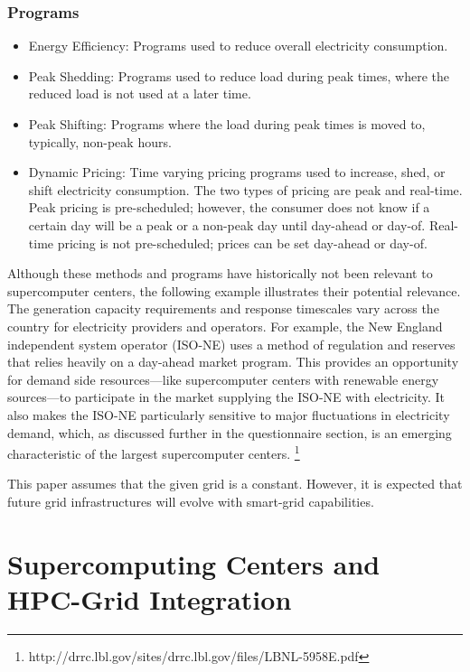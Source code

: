 \subsubsection{Programs}
\begin{itemize}
\item Energy Efficiency:  Programs used to reduce overall electricity consumption.

\item Peak Shedding:  Programs used to reduce load during peak times, 
where the reduced load is not used at a later time. 

\item Peak Shifting:  Programs where the load during peak times is moved to, typically, non-peak hours. 

\item Dynamic Pricing:  Time varying pricing programs used to increase, shed,
 or shift electricity consumption. 
The two types of pricing are peak and real-time.  Peak pricing is pre-scheduled; however, the consumer 
does not know if a certain day will be a peak or a non-peak day until day-ahead or day-of.  
Real-time pricing is not pre-scheduled; prices can be set day-ahead or day-of.
\end{itemize}

Although these methods and programs have historically not been relevant to supercomputer centers,
the following example illustrates their potential relevance.
The generation capacity requirements and response timescales vary across the country for electricity 
providers and operators. For example, the New England independent system operator (ISO-NE) uses a method 
of regulation and reserves that relies heavily on a day-ahead market program. This provides an opportunity 
for demand side resources---like supercomputer centers with renewable energy sources---to participate in the 
market supplying the ISO-NE with electricity.  It also makes the ISO-NE particularly sensitive to major 
fluctuations in electricity demand, which, as discussed further in the questionnaire section, is an emerging 
characteristic of the largest supercomputer centers.  
\footnote {http://drrc.lbl.gov/sites/drrc.lbl.gov/files/LBNL-5958E.pdf}

This paper assumes that the given grid is a constant. However, it is expected 
that future grid infrastructures will 
evolve with smart-grid capabilities. 

\section{Supercomputing Centers and \\ HPC-Grid Integration}

